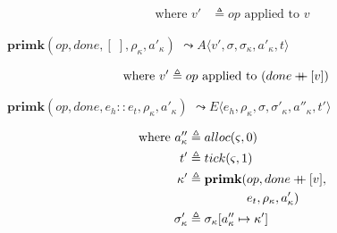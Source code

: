 \documentclass[12pt,draft]{article}
\newcommand\mdoubleplus{\ensuremath{\mathbin{+\mkern-9mu+}}}
\begin{document}
\begin{multicols*}{2}
\begin{align*}
\text{where } v' &\triangleq op \text{ applied to } v
\end{align*}
\begin{center}
  $\textbf{primk}(op, done, [\;], \rho_\kappa, a'_\kappa)$
  $\leadsto A\langle v' , \sigma , \sigma_\kappa , a'_\kappa , t \rangle$
\end{center}
\vspace{-7mm}
\begin{align*}
\text{where } v' &\triangleq op \text{ applied to } (done \mdoubleplus [v])
\end{align*}
\begin{center}
  $\textbf{primk}(op, done, e_h::e_t, \rho_\kappa, a'_\kappa)$
  $\leadsto E\langle e_h , \rho_\kappa ,\sigma ,\sigma'_\kappa,a''_\kappa, t' \rangle$
\end{center}
\vspace{-7mm}
\begin{align*}
  \text{where }
  a''_\kappa &\triangleq alloc(\varsigma, 0) \\
  t' &\triangleq tick(\varsigma, 1) \\
  \kappa' &\triangleq \textbf{primk}(op, done \mdoubleplus [v],\\
             &\;\;\;\;\;\;\;\;\;\;\;\;\;\;\;\;\;e_t, \rho_\kappa, a'_\kappa) \\
  \sigma'_\kappa &\triangleq \sigma_\kappa[a''_\kappa \mapsto \kappa']
\end{align*}
\end{multicols*}
\newpage

\end{document}
